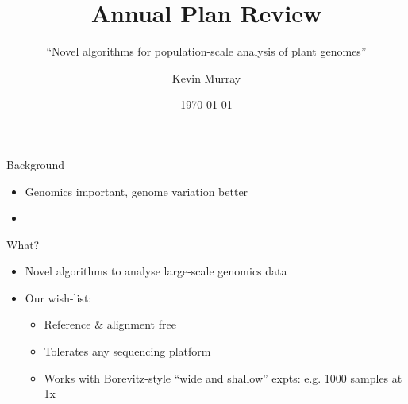 \documentclass[t]{beamer}
\title{Annual Plan Review}
\subtitle{\small{``Novel algorithms for population-scale analysis of plant
genomes''}}
\author{Kevin Murray}
\institute{Borevitz Lab, ANU}
\date{\today}
\begin{document}
{
\begin{frame}
  \titlepage
  \vfill
\end{frame}
}

\begin{frame}{Background}
  \begin{itemize}
    \item Genomics important, genome variation better
    \pause
    \item 
  \end{itemize}
\end{frame}

\begin{frame}{What?}
  \begin{itemize}
    \item Novel algorithms to analyse large-scale genomics data
  \pause
    \item Our wish-list:
    \begin{itemize}
      \item Reference \& alignment free
      \item Tolerates any sequencing platform
      \item Works with Borevitz-style ``wide and shallow'' expts: e.g. 1000
        samples at 1x
    \end{itemize}
  \end{itemize}
\end{frame}
\end{document}
